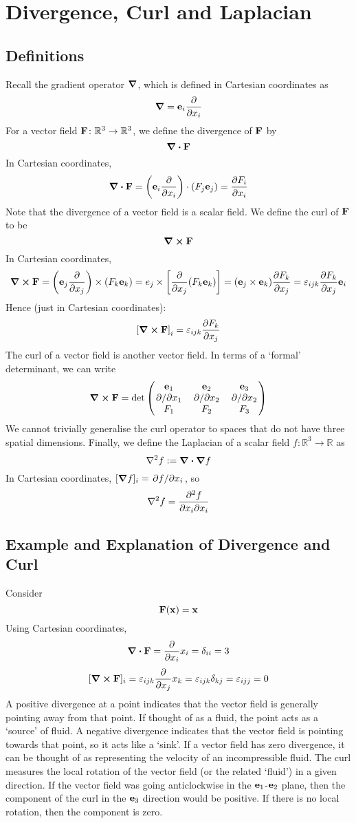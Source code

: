 \documentclass{article}
\begin{document}
\section{Divergence, Curl and Laplacian}
\subsection{Definitions}
Recall the gradient operator $\grad$, which is defined in Cartesian coordinates as
\[ \grad = \vb e_i \frac{\partial}{\partial x_i} \]
For a vector field $\vb F \colon \mathbb R^3 \to \mathbb R^3$, we define the divergence of $\vb F$ by
\[ \div{\vb F} \]
In Cartesian coordinates,
\[ \div{\vb F} = \left( \vb e_i \frac{\partial}{\partial x_i} \right) \cdot (F_j \vb e_j) = \pdv{F_i}{x_i} \]
Note that the divergence of a vector field is a scalar field. We define the curl of $\vb{F}$ to be
\[ \curl{\vb F} \]
In Cartesian coordinates,
\[ \curl{\vb F} = \left( \vb e_j \pdv{x_j} \right) \times (F_k \vb e_k) = e_j \times \left[ \pdv{x_j}(F_k \vb e_k) \right] = (\vb e_j \times \vb e_k) \pdv{F_k}{x_j} = \varepsilon_{ijk} \pdv{F_k}{x_j}\vb e_i \]
Hence (just in Cartesian coordinates):
\[ \left[ \curl{\vb F} \right]_i = \varepsilon_{ijk} \pdv{F_k}{x_j} \]
The curl of a vector field is another vector field. In terms of a `formal' determinant, we can write
\[ \curl{\vb F} = \det \begin{pmatrix}
		\vb e_1    & \vb e_2    & \vb e_3    \\
		\pdv*{x_1} & \pdv*{x_2} & \pdv*{x_2} \\
		F_1        & F_2        & F_3
	\end{pmatrix} \]
We cannot trivially generalise the curl operator to spaces that do not have three spatial dimensions. Finally, we define the Laplacian of a scalar field $f \colon \mathbb R^3 \to \mathbb R$ as
\[ \laplacian{f} := \div{\grad{f}} \]
In Cartesian coordinates, $[\grad{f}]_i = \pdv*{f}{x_i}$, so
\[ \laplacian{f} = \pdv{f}{x_i}{x_i} \]

\subsection{Example and Explanation of Divergence and Curl}
Consider
\[ \vb F(\vb x) = \vb x \]
Using Cartesian coordinates,
\[ \div{\vb F} = \pdv{x_i}x_i = \delta_{ii} = 3 \]
\[ [\curl{\vb F}]_i = \varepsilon_{ijk} \pdv{x_j} x_k = \varepsilon_{ijk} \delta_{kj} = \varepsilon_{ijj} = 0 \]
A positive divergence at a point indicates that the vector field is generally pointing away from that point. If thought of as a fluid, the point acts as a `source' of fluid. A negative divergence indicates that the vector field is pointing towards that point, so it acts like a `sink'. If a vector field has zero divergence, it can be thought of as representing the velocity of an incompressible fluid. The curl measures the local rotation of the vector field (or the related `fluid') in a given direction. If the vector field was going anticlockwise in the $\vb e_1$-$\vb e_2$ plane, then the component of the curl in the $\vb e_3$ direction would be positive. If there is no local rotation, then the component is zero.
\end{document}

